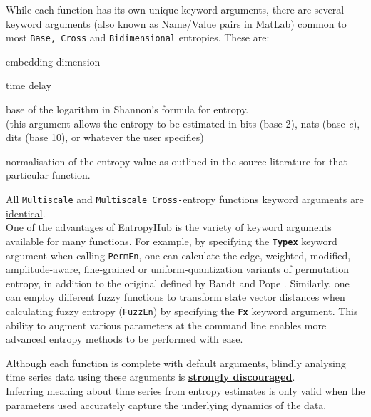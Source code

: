 \documentclass[12pt, a4paper, titlepage, openany]{book}
\begin{document}
While each function has its own unique keyword arguments, there are several keyword arguments (also known as Name/Value pairs in MatLab) common to most \texttt{Base, Cross} and \texttt{Bidimensional} entropies. These are: \small
\begin{description}[labelsep=5mm, labelwidth=3cm, nosep,style=multiline,leftmargin=45mm]
\item[\texttt{\textbf{m}}]  	embedding dimension
\item[\texttt{\textbf{tau}}] time delay
\item[\texttt{\textbf{Logx}}]  	base of the logarithm in Shannon’s formula for entropy. \\
					(this argument allows the entropy to be estimated in bits (base 2), nats (base \emph{e}), dits (base 10), or whatever the user specifies)
\item[\texttt{\textbf{Norm}}]  normalisation of the entropy value as outlined in the source literature for that particular function.
\end{description}

\vspace{4mm}\normalsize
\noindent All \texttt{Multiscale} and \texttt{Multiscale Cross-}entropy functions keyword arguments are \ul{identical}.\\
 
One of the advantages of EntropyHub is the variety of keyword arguments available for many functions. For example, by specifying the \texttt{\textbf{Typex}} keyword argument when calling \texttt{PermEn}, one can calculate the edge, weighted, modified, amplitude-aware, fine-grained or uniform-quantization variants of permutation entropy, in addition to the original defined by Bandt and Pope \cite{Perm1}. Similarly, one can employ different fuzzy functions to transform state vector distances when calculating fuzzy entropy (\texttt{FuzzEn}) by specifying the \texttt{\textbf{Fx}} keyword argument. This ability to augment various parameters at the command line enables more advanced entropy methods to be performed with ease. \\

\begin{tcolorbox}[sharp corners, colback=ehone!30, colframe=ehone, title=\textbf{IMPORTANT NOTE}]
Although each function is complete with default arguments, blindly analysing time series data using these arguments is \textbf{\ul{strongly discouraged}}.\\ Inferring meaning about time series from entropy estimates is only valid when the parameters used accurately capture the underlying dynamics of the data.
\end{tcolorbox}
\end{document}
